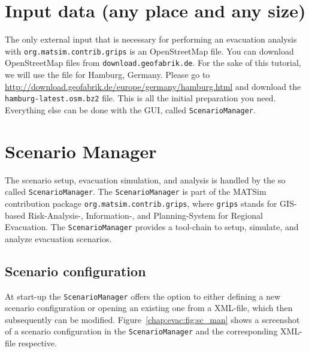 \section{Input data (any place and any size)}\label{grips:input}
The only external input that is necessary for performing an evacuation analysis with \lstinline|org.matsim.contrib.grips| is an OpenStreetMap file.
You can download OpenStreetMap files from 
\lstinline+download.geofabrik.de+.
For the sake of this tutorial, we will use the file for Hamburg, Germany. 
Please go to \url{http://download.geofabrik.de/europe/germany/hamburg.html} and download the \lstinline+hamburg-latest.osm.bz2+ file. This is all the initial preparation you need. Everything else can 
be done with the GUI, called \lstinline+ScenarioManager+.

\section{Scenario Manager}\label{grips:scm}

The scenario setup, evacuation simulation, and analysis is handled by the so called \lstinline+ScenarioManager+.
The \lstinline+ScenarioManager+ is part of the MATSim contribution package \lstinline+org.matsim.contrib.grips+, where \lstinline+grips+ stands for GIS-based Risk-Analysis-, Information-, and Planning-System for Regional Evacuation.
The \lstinline+ScenarioManager+ provides a tool-chain to setup, simulate, and analyze evacuation scenarios.

\subsection{Scenario configuration}


 At start-up the \lstinline+ScenarioManager+ offers the option to either defining a new scenario configuration or opening an existing one from a XML-file, which then subsequently can be modified. Figure~\ref{chap:evac:fig:sc_man} shows a screenshot of a scenario configuration in the \lstinline+ScenarioManager+ and the corresponding XML-file respective.


